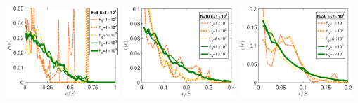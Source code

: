 \documentclass{minimal}
\begin{document}
\includegraphics[width=0.32\textwidth]{N=5_energydistribution_500_400_Font16.eps} 
\includegraphics[width=0.32\textwidth]{N=10_energydistribution_500_400_Font16.eps}
\includegraphics[width=0.32\textwidth]{N=20_energydistribution_500_400_Font16.eps}
\end{document}
